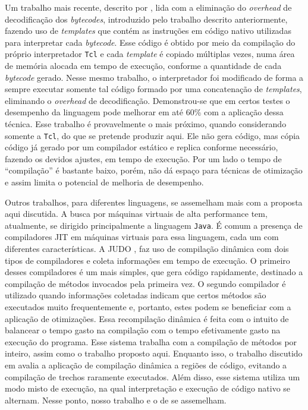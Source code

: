 Um trabalho mais recente, descrito por , lida
com a eliminação do \textit{overhead} de decodificação dos
\textit{bytecodes}, introduzido pelo trabalho descrito anteriormente,
fazendo uso de \textit{templates} que contém as instruções em
código nativo utilizadas para interpretar cada \textit{bytecode}.
Esse código é obtido por meio da compilação do próprio interpretador
\texttt{Tcl} e cada \textit{template} é copiado múltiplas vezes,
numa área de memória alocada em tempo de execução, conforme a quantidade de
cada \textit{bytecode} gerado. Nesse mesmo trabalho, o interpretador foi
modificado de forma a sempre executar somente tal código formado por
uma concatenação de \textit{templates}, eliminando o \textit{overhead} de
decodificação. Demonstrou-se que em certos testes o desempenho da
linguagem pode melhorar em até 60\% com a aplicação dessa técnica.
Esse trabalho é provavelmente o mais próximo, quando considerando
somente a \texttt{Tcl}, do que se pretende produzir aqui.
Ele não gera código, mas cópia código já gerado por um compilador
estático e replica conforme necessário, fazendo os devidos
ajustes, em tempo de execução. Por um lado o tempo de ``compilação'' é
bastante baixo, porém, não dá espaço para técnicas de otimização e assim
limita o potencial de melhoria de desempenho.

Outros trabalhos, para diferentes linguagens, se assemelham mais com a
proposta aqui discutida. A busca por máquinas virtuais de alta
performance tem, atualmente, se dirigido principalmente a linguagem
\texttt{Java}. É comum a presença de compiladores JIT em máquinas
virtuais para essa linguagem, cada um com diferentes
características. A JUDO \cite{judo}, faz uso
de compilação dinâmica com dois tipos de compiladores e coleta
informações em tempo de execução. O primeiro desses compiladores é um
mais simples, que gera código rapidamente, destinado a compilação
de métodos invocados pela primeira vez. O segundo compilador é
utilizado quando informações coletadas indicam que certos métodos
são executados muito frequentemente e, portanto, estes podem se
beneficiar com a aplicação de otimizações. Essa recompilação dinâmica
é feita com o intuito de balancear o tempo gasto na compilação com o tempo
efetivamente gasto na execução do programa. Esse sistema trabalha com
a compilação de métodos por inteiro, assim como o trabalho proposto
aqui. Enquanto isso, o trabalho discutido em 
avalia a aplicação de compilação dinâmica a regiões de código, evitando
a compilação de trechos raramente executados. Além disso, esse sistema
utiliza um modo misto de execução, na qual interpretação e execução de
código nativo se alternam. Nesse ponto, nosso trabalho e o de
 se assemelham.

